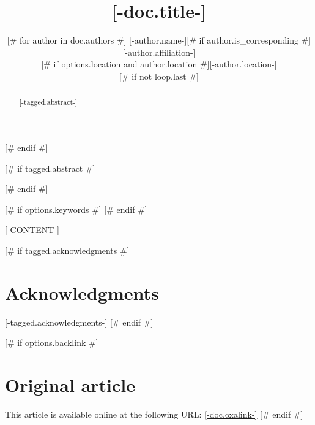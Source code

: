 \documentclass{article}
\title{[-doc.title-]}
\date{\displaydate{articleDate}}
[# else #]
\date{}
[# endif #]
\author{[# for author in doc.authors #]
[-author.name-][# if author.is_corresponding #]\footnotemark[1][# endif #]\\
[# if options.affiliation and author.affiliation #][-author.affiliation-]\\[# endif #]
[# if options.location and author.location #][-author.location-]\\[# endif #]
[# if not loop.last #]
\AND
[# endif #]
[# endfor #]
}
\begin{document}
[# endif #]

[# if tagged.abstract #]
\begin{abstract}
[-tagged.abstract-]
\end{abstract}
[# endif #]

[# if options.keywords #]
[# endif #]

[-CONTENT-]

[# if tagged.acknowledgments #]
\section*{Acknowledgments}
[-tagged.acknowledgments-]
[# endif #]

[# if options.backlink #]
\section*{Original article}
\footnotesize
This article is available online at the following URL: \href{[-doc.oxalink-]}{[-doc.oxalink-]}
\normalsize
[# endif #]



\end{document}
